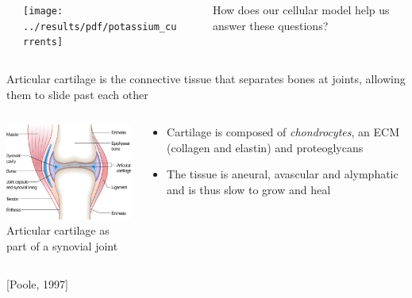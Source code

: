 \documentclass{beamer}
\newcommand{\references}[1] {
  \begin{flushright}
    \scriptsize [#1] \normalsize
  \end{flushright}
}
\begin{document}
\begin{frame}
\begin{columns}
    \begin{column}{2cm}
    \end{column}
    \begin{column}{2cm}
      \texttt{[image: ../results/pdf/potassium\_currents]}
    \end{column}
    \begin{column}{0cm}
    \end{column}
    \begin{column}{7cm}
      How does our cellular model help us answer these questions?
    \end{column}
  \end{columns}
\end{frame}


\begin{frame}{Articular cartilage is the connective tissue that
    separates bones at joints, allowing them to slide past each other}

  \begin{columns}

    \begin{column}{6cm}
      \begin{center}
      \includegraphics[width=6cm]{../images/pdf/joint}
      {\\[-0.1cm] \scriptsize Articular cartilage as part of a
        synovial joint}
      \end{center}
    \end{column}

    \begin{column}{6cm}
      \begin{itemize}
      \item <1-> Cartilage is composed of {\em chondrocytes}, an ECM
        (collagen and elastin) and proteoglycans\\[0.5cm]
        \pause
      \item<2-> The tissue is aneural, avascular and alymphatic and is
        thus slow to grow and heal
      \end{itemize}
    \end{column}

  \end{columns}

  \references{Poole, 1997}

\end{frame}
\end{document}
